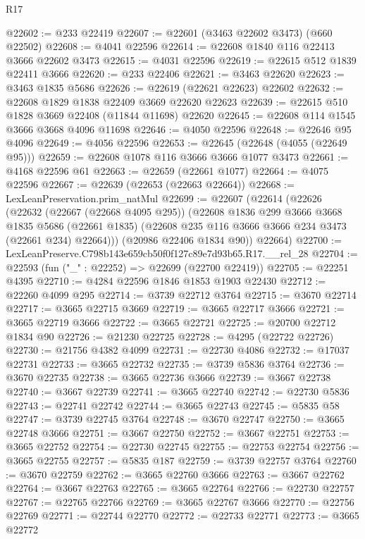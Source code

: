 \begin{lexlean}{R17}
\begin{coremodule}
@22602 := @233 @22419
@22607 := @22601 (@3463 @22602 @3473) (@660 @22502)
@22608 := @4041 @22596
@22614 := @22608 @1840 @116 @22413 @3666 @22602 @3473
@22615 := @4031 @22596
@22619 := @22615 @512 @1839 @22411 @3666
@22620 := @233 @22406
@22621 := @3463 @22620
@22623 := @3463 @1835 @5686
@22626 := @22619 (@22621 @22623) @22602
@22632 := @22608 @1829 @1838 @22409 @3669 @22620 @22623
@22639 := @22615 @510 @1828 @3669 @22408 (@11844 @11698) @22620
@22645 := @22608 @114 @1545 @3666 @3668 @4096 @11698
@22646 := @4050 @22596
@22648 := @22646 @95 @4096
@22649 := @4056 @22596
@22653 := @22645 (@22648 (@4055 (@22649 @95)))
@22659 := @22608 @1078 @116 @3666 @3666 @1077 @3473
@22661 := @4168 @22596 @61
@22663 := @22659 (@22661 @1077)
@22664 := @4075 @22596
@22667 := @22639 (@22653 (@22663 @22664))
@22668 := LexLeanPreservation.prim_natMul
@22699 := @22607
    (@22614
      (@22626
        (@22632
          (@22667 (@22668 @4095 @295))
          (@22608
            @1836
            @299
            @3666
            @3668
            @1835
            @5686
            (@22661 @1835)
            (@22608 @235 @116 @3666 @3666 @234 @3473 (@22661 @234) @22664)))
        (@20986 @22406 @1834 @90))
      @22664)
@22700 := LexLeanPreserve.C798b143e659cb50f0f127c89e7d93b65.R17.__rel_28
@22704 := @22593 (fun ("_" : @22252) => @22699 (@22700 @22419))
@22705 := @22251 @4395
@22710 := @4284 @22596 @1846 @1853 @1903 @22430
@22712 := @22260 @4099 @295
@22714 := @3739 @22712 @3764
@22715 := @3670 @22714
@22717 := @3665 @22715 @3669
@22719 := @3665 @22717 @3666
@22721 := @3665 @22719 @3666
@22722 := @3665 @22721
@22725 := @20700 @22712 @1834 @90
@22726 := @21230 @22725
@22728 := @4295 (@22722 @22726)
@22730 := @21756 @4382 @4099
@22731 := @22730 @4086
@22732 := @17037 @22731
@22733 := @3665 @22732
@22735 := @3739 @5836 @3764
@22736 := @3670 @22735
@22738 := @3665 @22736 @3666
@22739 := @3667 @22738
@22740 := @3667 @22739
@22741 := @3665 @22740
@22742 := @22730 @5836
@22743 := @22741 @22742
@22744 := @3665 @22743
@22745 := @5835 @58
@22747 := @3739 @22745 @3764
@22748 := @3670 @22747
@22750 := @3665 @22748 @3666
@22751 := @3667 @22750
@22752 := @3667 @22751
@22753 := @3665 @22752
@22754 := @22730 @22745
@22755 := @22753 @22754
@22756 := @3665 @22755
@22757 := @5835 @187
@22759 := @3739 @22757 @3764
@22760 := @3670 @22759
@22762 := @3665 @22760 @3666
@22763 := @3667 @22762
@22764 := @3667 @22763
@22765 := @3665 @22764
@22766 := @22730 @22757
@22767 := @22765 @22766
@22769 := @3665 @22767 @3666
@22770 := @22756 @22769
@22771 := @22744 @22770
@22772 := @22733 @22771
@22773 := @3665 @22772

\end{coremodule}
\end{lexlean}
